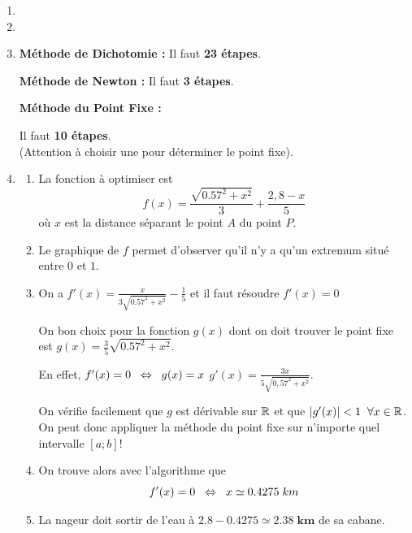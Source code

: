 \documentclass[11pt,a4paper,twoside]{report}
\begin{document}
\begin{enumerate}[label=R4.\arabic*, font=\bfseries, itemsep=8mm,labelsep*=4mm]
\item
{}







\item
{}







\item
\textbf{Méthode de Dichotomie :} Il faut \textbf{23 étapes}.

\smallskip
\textbf{Méthode de Newton :} Il faut \textbf{3 étapes}.

\smallskip
\textbf{Méthode du Point Fixe :} \begin{minipage}[t]{0.7\textwidth}Il faut \textbf{10 étapes}.\\ {\small(Attention à choisir une  pour déterminer le point fixe)}.\end{minipage}

\clearpage





\item\begin{enumerate}[label=\roman*),itemsep=5mm]
\item
La fonction à optimiser est $$f(x)=\frac{\sqrt{0.57^2+x^2}}{3}+\frac{2,8-x}{5}$$ où $x$ est la distance séparant le point $A$ du point $P$.

\item
Le graphique de $f$ permet d'observer qu'il n'y a qu'un extremum situé entre $0$ et $1$.

\item
On a $f'(x)=\frac{x}{3\sqrt{0.57^2+x^2}}-\frac{1}{5}$ et il faut résoudre $f'(x)=0$

\smallskip
On bon choix pour la fonction $g(x)$ dont on doit trouver le point fixe est $g(x)=\frac{3}{5}\sqrt{0.57^2+x^2}$.

\smallskip
En effet, $f'(x)=0 \ssi[2] g(x)=x$  $g'(x)=\frac{3x}{5\sqrt{0,57^2+x^2}}$.

\smallskip
On vérifie facilement que $g$ est dérivable sur $\R$ et que $\vert g'(x)\vert <1 \eh{2}\forall x\in \R$. On peut donc appliquer la méthode du point fixe sur n'importe quel intervalle $[a;b]$!

\item
On trouve alors avec l'algorithme  que $$f'(x)=0 \ssi[2] x\simeq 0.4275\; km$$

\item
La nageur doit sortir de l'eau à $2.8-0.4275\simeq \bm{2.38\;km}$ de sa cabane.

\end{enumerate}







\end{enumerate}
\end{document}
